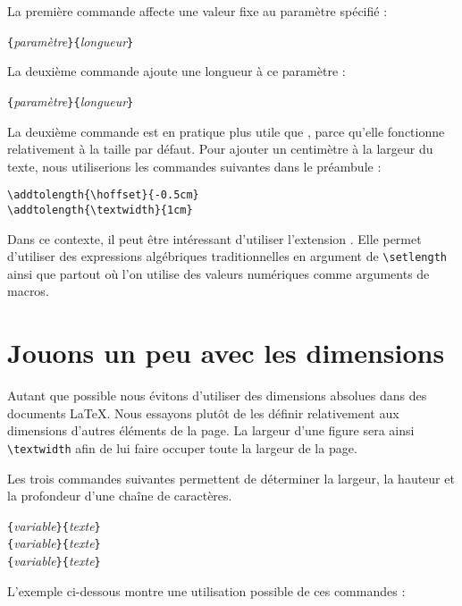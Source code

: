 La première commande affecte une valeur fixe  au paramètre spécifié :
\begin{lscommand}
\verb|{|\emph{paramètre}\verb|}{|\emph{longueur}\verb|}|
\end{lscommand}

La deuxième commande ajoute une longueur à ce paramètre :
\begin{lscommand}
\verb|{|\emph{paramètre}\verb|}{|\emph{longueur}\verb|}|
\end{lscommand}

La deuxième commande est en pratique plus utile que ,
parce qu'elle fonctionne relativement à la taille
par défaut. Pour ajouter un centimètre à la largeur du texte, nous
utiliserions les commandes suivantes dans le préambule :
\begin{code}
\verb|\addtolength{\hoffset}{-0.5cm}|\\
\verb|\addtolength{\textwidth}{1cm}|
\end{code}

Dans ce contexte, il peut être intéressant d'utiliser l'extension
. Elle permet d'utiliser des expressions algébriques
traditionnelles en argument de \verb|\setlength| ainsi que partout où
l'on utilise des valeurs numériques comme arguments de macros.

\section{Jouons un peu avec les dimensions}

Autant que possible nous évitons d'utiliser des dimensions absolues
dans des documents \LaTeX{}. Nous essayons plutôt de les définir
relativement aux dimensions d'autres éléments de la page. La largeur
d'une figure sera ainsi \verb|\textwidth| afin de lui faire occuper
toute la largeur de la page.

Les trois commandes suivantes permettent de déterminer la largeur, la
hauteur et la profondeur d'une chaîne de caractères.

\begin{lscommand}
\verb|{|\emph{variable}\verb|}{|\emph{texte}\verb|}|\\
\verb|{|\emph{variable}\verb|}{|\emph{texte}\verb|}|\\
\verb|{|\emph{variable}\verb|}{|\emph{texte}\verb|}|
\end{lscommand}

\bigbreak
L'exemple ci-dessous montre une utilisation possible de ces
commandes :

